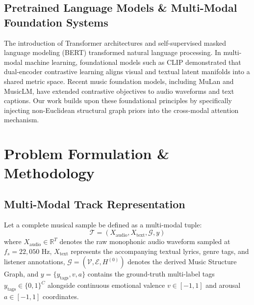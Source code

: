 \documentclass{article}
\begin{document}
\subsection{Pretrained Language Models \& Multi-Modal Foundation Systems}
The introduction of Transformer architectures and self-supervised masked language modeling (BERT) transformed natural language processing. In multi-modal machine learning, foundational models such as CLIP demonstrated that dual-encoder contrastive learning aligns visual and textual latent manifolds into a shared metric space. Recent music foundation models, including MuLan and MusicLM, have extended contrastive objectives to audio waveforms and text captions. Our work builds upon these foundational principles by specifically injecting non-Euclidean structural graph priors into the cross-modal attention mechanism.

\section{Problem Formulation \& Methodology}
\label{sec:methodology}

\subsection{Multi-Modal Track Representation}
Let a complete musical sample be defined as a multi-modal tuple:
\begin{equation}
\mathcal{T} = \left( X_{\text{audio}}, X_{\text{text}}, \mathcal{G}, y \right)
\end{equation}
where $X_{\text{audio}} \in \mathbb{R}^{T}$ denotes the raw monophonic audio waveform sampled at $f_s = 22,050\text{ Hz}$, $X_{\text{text}}$ represents the accompanying textual lyrics, genre tags, and listener annotations, $\mathcal{G} = (\mathcal{V}, \mathcal{E}, H^{(0)})$ denotes the derived Music Structure Graph, and $y = \{y_{\text{tags}}, v, a\}$ contains the ground-truth multi-label tags $y_{\text{tags}} \in \{0, 1\}^C$ alongside continuous emotional valence $v \in [-1, 1]$ and arousal $a \in [-1, 1]$ coordinates.
\end{document}
